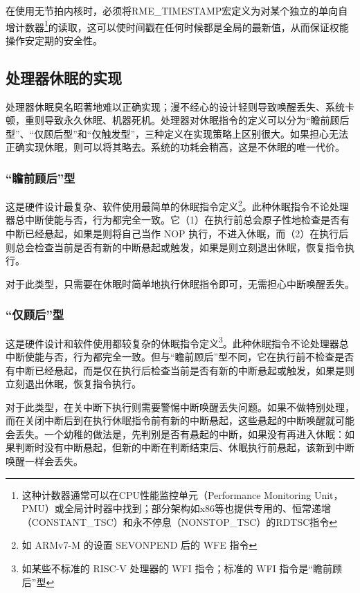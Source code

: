 在使用无节拍内核时，必须将RME\_TIMESTAMP宏定义为对某个独立的单向自增计数器\footnote{这种计数器通常可以在CPU性能监控单元（Performance Monitoring
  Unit，PMU）或全局计时器中找到；部分架构如x86等也提供专用的、恒常递增（CONSTANT\_TSC）和永不停息（NONSTOP\_TSC）的RDTSC指令}的读取，这可以使时间戳在任何时候都是全局的最新值，从而保证权能操作安定期的安全性。

\subsection{处理器休眠的实现}\label{subsec:9-processor-sleep}

处理器休眠臭名昭著地难以正确实现；漫不经心的设计轻则导致唤醒丢失、系统卡顿，重则导致永久休眠、机器死机。处理器对休眠指令的定义可以分为``瞻前顾后型''、``仅顾后型''和``仅触发型''，三种定义在实现策略上区别很大。如果担心无法正确实现休眠，则可以将其略去。系统的功耗会稍高，这是不休眠的唯一代价。

\subsubsection{``瞻前顾后''型}\label{subsubsec:9-sleep-look-before-and-after}

这是硬件设计最复杂、软件使用最简单的休眠指令定义\footnote{如 ARMv7-M 的设置 SEVONPEND 后的 WFE 指令}。此种休眠指令不论处理器总中断使能与否，行为都完全一致。它（1）在执行前总会原子性地检查是否有中断已经悬起，如果是则将自己当作 NOP 执行，不进入休眠，而（2）在执行后则总会检查当前是否有新的中断悬起或触发，如果是则立刻退出休眠，恢复指令执行。

对于此类型，只需要在休眠时简单地执行休眠指令即可，无需担心中断唤醒丢失。

\subsubsection{``仅顾后''型}\label{subsubsec:9-sleep-after-only}

这是硬件设计和软件使用都较复杂的休眠指令定义\footnote{如某些不标准的 RISC-V 处理器的 WFI 指令；标准的 WFI 指令是``瞻前顾后''型}。此种休眠指令不论处理器总中断使能与否，行为都完全一致。但与``瞻前顾后''型不同，它在执行前不检查是否有中断已经悬起，而是仅在执行后检查当前是否有新的中断悬起或触发，如果是则立刻退出休眠，恢复指令执行。

对于此类型，在关中断下执行则需要警惕中断唤醒丢失问题。如果不做特别处理，而在关闭中断后到在执行休眠指令前有新的中断悬起，这些悬起的中断唤醒就可能会丢失。一个幼稚的做法是，先判别是否有悬起的中断，如果没有再进入休眠：如果判断时没有中断悬起，但新的中断在判断结束后、休眠执行前悬起，该新到中断唤醒一样会丢失。

